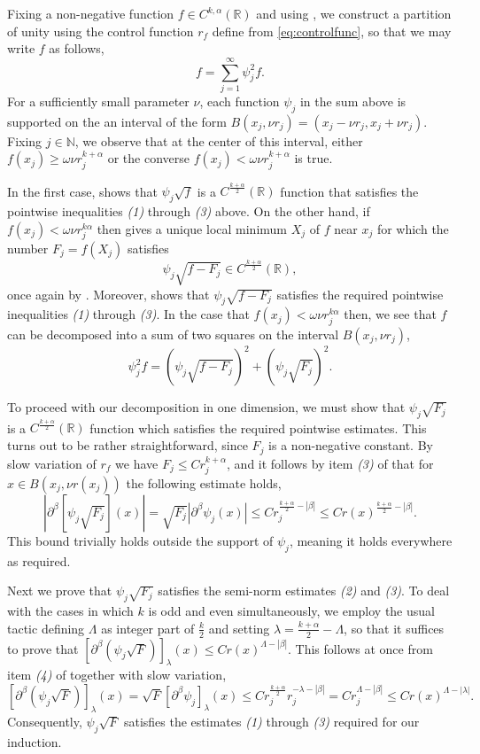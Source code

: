 \documentclass[oneside,hidelinks,indentfirst,10pt]{book}
\begin{document}
Fixing a non-negative function \(f\in C^{k,\alpha}(\mathbb{R})\) and using , we construct a partition of unity using the control function \(r_f\) define from \eqref{eq:controlfunc}, so that we may write \(f\) as follows,
\[
    f=\sum_{j=1}^\infty\psi_j^2f.
\]
For a sufficiently small parameter \(\nu\), each function \(\psi_j\) in the sum above is supported on the an interval of the form \(B(x_j,\nu r_j)=(x_j-\nu r_j,x_j+\nu r_j)\). Fixing \(j\in\mathbb{N}\), we observe that at the center of this interval, either \(f(x_j)\geq \omega\nu r_j^{k+\alpha}\) or the converse \(f(x_j)<\omega\nu r_j^{k+\alpha}\) is true.


In the first case,  shows that \(\psi_j\sqrt{f}\) is a \(C^\frac{k+\alpha}{2}(\mathbb{R})\) function that satisfies the pointwise inequalities \textit{(1)} through \textit{(3)} above. On the other hand, if \(f(x_j)<\omega\nu r_j^{k\alpha}\) then  gives a unique local minimum \(X_j\) of \(f\) near \(x_j\) for which the number \(F_j=f(X_j)\) satisfies 
\[
    \psi_j\sqrt{f-F_j}\in C^\frac{k+\alpha}{2}(\mathbb{R}),
\] 
once again by . Moreover,  shows that \(\psi_j\sqrt{f-F_j}\) satisfies the required pointwise inequalities \textit{(1)} through \textit{(3)}. In the case that \(f(x_j)<\omega\nu r_j^{k\alpha}\) then, we see that \(f\) can be decomposed into a sum of two squares on the interval \(B(x_j,\nu r_j)\),
\[
    \psi_j^2f=(\psi_j\sqrt{f-F_j})^2+(\psi_j\sqrt{F_j})^2.
\]


To proceed with our decomposition in one dimension, we must show that \(\psi_j\sqrt{F_j}\) is a \(C^\frac{k+\alpha}{2}(\mathbb{R})\) function which satisfies the required pointwise estimates. This turns out to be rather straightforward, since \(F_j\) is a non-negative constant. By slow variation of \(r_f\) we have \(F_j\leq Cr_j^{k+\alpha}\), and it follows by item \textit{(3)} of  that for \(x\in B(x_j,\nu r(x_j))\) the following estimate holds,
\[
    |\partial^\beta[\psi_j\sqrt{F_j}](x)|=\sqrt{F_j}|\partial^\beta\psi_j(x)|\leq Cr_j^{\frac{k+\alpha}{2}-|\beta|}\leq Cr(x)^{\frac{k+\alpha}{2}-|\beta|}.
\]
This bound trivially holds outside the support of \(\psi_j\), meaning it holds everywhere as required. 


Next we prove that \(\psi_j\sqrt{F_j}\) satisfies the semi-norm estimates \textit{(2)} and \textit{(3)}. To deal with the cases in which \(k\) is odd and even simultaneously, we employ the usual tactic defining \(\Lambda\) as integer part of \(\frac{k}{2}\) and setting \(\lambda=\frac{k+\alpha}{2}-\Lambda\), so that it suffices to prove that \([\partial^\beta(\psi_j\sqrt{F})]_\lambda(x)\leq Cr(x)^{\Lambda-|\beta|}\). This follows at once from item \textit{(4)} of  together with slow variation,
\[
    [\partial^\beta(\psi_j\sqrt{F})]_\lambda(x)=\sqrt{F}[\partial^\beta\psi_j]_\lambda(x)\leq Cr_j^\frac{k+\alpha}{2}r_j^{-\lambda-|\beta|}=Cr_j^{\Lambda-|\beta|}\leq Cr(x)^{\Lambda-|\lambda|}.
\]
Consequently, \(\psi_j\sqrt{F}\) satisfies the estimates \textit{(1)} through \textit{(3)} required for our induction. 
\end{document}
